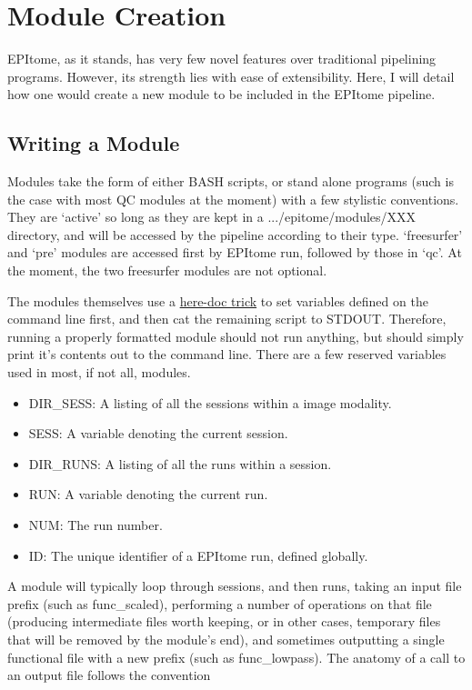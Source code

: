 \documentclass[final,titlepage,letterpaper,oneside,12pt]{article}
\renewcommand{\texttt}[2][BrickRed]{\textcolor{#1}{\ttfamily #2}}%
\begin{document}
\section{Module Creation}

EPItome, as it stands, has very few novel features over traditional pipelining programs. However, its strength lies with ease of extensibility. Here, I will detail how one would create a new module to be included in the EPItome pipeline.

\subsection{Writing a Module}

Modules take the form of either BASH scripts, or stand alone programs (such is the case with most QC modules at the moment) with a few stylistic conventions. They are `active' so long as they are kept in a \texttt{.../epitome/modules/XXX} directory, and will be accessed by the pipeline according to their type. `freesurfer' and `pre' modules are accessed first by \texttt{EPItome run}, followed by those in `qc'. At the moment, the two freesurfer modules are not optional.

The modules themselves use a \href{http://tldp.org/LDP/abs/html/here-docs.html}{here-doc trick} to set variables defined on the command line first, and then \texttt{cat} the remaining script to \texttt{STDOUT}. Therefore, running a properly formatted module should not run anything, but should simply print it's contents out to the command line. There are a few reserved variables used in most, if not all, modules. 

\begin{itemize}
    \item{DIR\_SESS: A listing of all the sessions within a image modality.}
    \item{SESS: A variable denoting the current session.}
    \item{DIR\_RUNS: A listing of all the runs within a session.}
    \item{RUN: A variable denoting the current run.}
    \item{NUM: The run number.}
    \item{ID: The unique identifier of a EPItome run, defined globally.}
\end{itemize}

A module will typically loop through sessions, and then runs, taking an input file prefix (such as \texttt{func\_scaled}), performing a number of operations on that file (producing intermediate files worth keeping, or in other cases, temporary files that will be removed by the module's end), and sometimes outputting a single functional file with a new prefix (such as \texttt{func\_lowpass}). The anatomy of a call to an output file follows the convention \\
\end{document}
